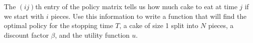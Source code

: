 \begin{problem}
The $(ij)$th entry of the policy matrix tells us how much cake to eat at time $j$ if we start with $i$ pieces.
Use this information to write a function  that will find the optimal policy for the stopping time $T$, a cake of size 1 split into $N$ pieces, a discount factor $\beta$, and the utility function $u$.



\end{problem}







